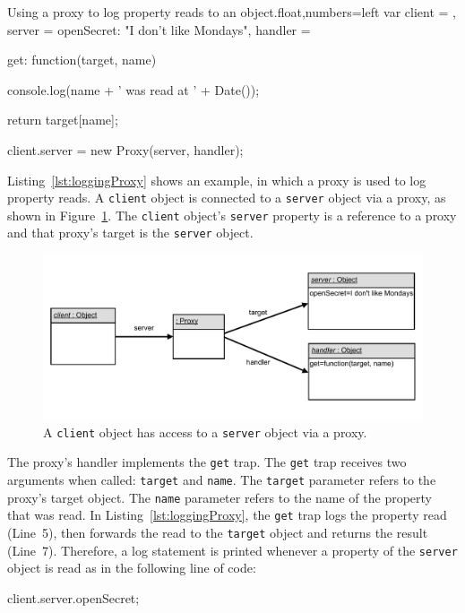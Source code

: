 \begin{code}{Using a proxy to log property reads to an object.}{float,numbers=left}
var client = {},
    server = {openSecret: "I don't like Mondays"},
    handler = {
        get: function(target, name) {
            console.log(name + ' was read at ' + Date());
            
            return target[name];
        }
    }

client.server = new Proxy(server, handler);
\end{code}
\iffalse
\end{verbatim}\fi

Listing~\ref{lst:loggingProxy} shows an example, in which a proxy is used to log property reads.
A \lstinline{client} object is connected to a \lstinline{server} object via a proxy, as shown in Figure~\ref{fig:LoggingProxy}.
The \lstinline{client} object's \lstinline{server} property is a reference to a proxy and that proxy's target is the \lstinline{server} object.

\begin{figure}[h]
    \centering
    \includegraphics[width=\textwidth]{figures/5_implementation/1_loggingProxy.pdf}
    \caption{A \lstinline{client} object has access to a \lstinline{server} object via a proxy.}
    \label{fig:LoggingProxy}
\end{figure}

The proxy's handler implements the \lstinline{get} trap.
The \lstinline{get} trap receives two arguments when called: \lstinline{target} and \lstinline{name}.
The \lstinline{target} parameter refers to the proxy's target object.
The \lstinline{name} parameter refers to the name of the property that was read.
In Listing~\ref{lst:loggingProxy}, the \lstinline{get} trap logs the property read (Line~5), then forwards the read to the \lstinline{target} object and returns the result (Line~7).
Therefore, a log statement is printed whenever a property of the \lstinline{server} object is read as in the following line of code:

\begin{code}[]{}{}
client.server.openSecret;
\end{code}
\iffalse
\end{verbatim}\fi

